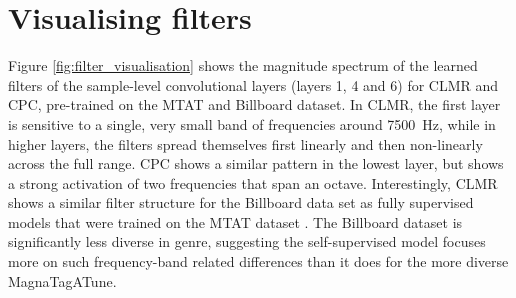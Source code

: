 \section{Visualising filters}
Figure \ref{fig:filter_visualisation} shows the magnitude spectrum of the learned filters of the sample-level convolutional layers (layers 1, 4 and 6) for CLMR and CPC, pre-trained on the MTAT and Billboard dataset. In CLMR, the first layer is sensitive to a single, very small band of frequencies around 7500~Hz, while in higher layers, the filters spread themselves first linearly and then non-linearly across the full range. CPC shows a similar pattern in the lowest layer, but shows a strong activation of two frequencies that span an octave. Interestingly, CLMR shows a similar filter structure for the Billboard data set as fully supervised models that were trained on the MTAT dataset \cite{dieleman2014end,lee2018samplecnn}. The Billboard dataset is significantly less diverse in genre, suggesting the self-supervised model focuses more on such frequency-band related differences than it does for the more diverse Magna\-Tag\-A\-Tune.


